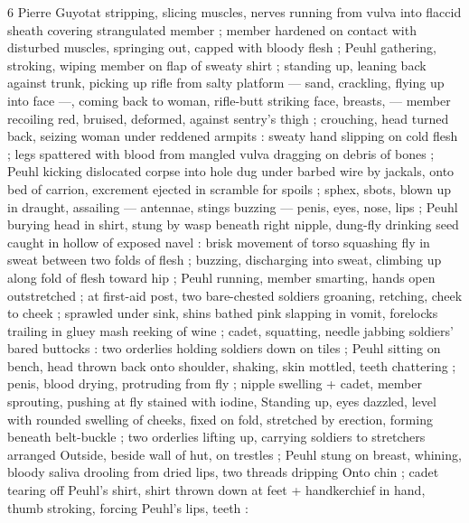 6 Pierre Guyotat
stripping, slicing muscles, nerves running from vulva into flaccid
sheath covering strangulated member ; member hardened on contact
with disturbed muscles, springing out, capped with bloody flesh ;
Peuhl gathering, stroking, wiping member on flap of sweaty shirt ;
standing up, leaning back against trunk, picking up rifle from salty
platform — sand, crackling, flying up into face —, coming back to
woman, rifle-butt striking face, breasts, — member recoiling red,
bruised, deformed, against sentry’s thigh ; crouching, head turned
back, seizing woman under reddened armpits : sweaty hand slipping
on cold flesh ; legs spattered with blood from mangled vulva
dragging on debris of bones ; Peuhl kicking dislocated corpse into
hole dug under barbed wire by jackals, onto bed of carrion,
excrement ejected in scramble for spoils ; sphex, sbots, blown up in
draught, assailing — antennae, stings buzzing — penis, eyes, nose,
lips ; Peuhl burying head in shirt, stung by wasp beneath right
nipple, dung-fly drinking seed caught in hollow of exposed navel :
brisk movement of torso squashing fly in sweat between two folds of
flesh ; buzzing, discharging into sweat, climbing up along fold of
flesh toward hip ; Peuhl running, member smarting, hands open
outstretched ; at first-aid post, two bare-chested soldiers groaning,
retching, cheek to cheek ; sprawled under sink, shins bathed pink
slapping in vomit, forelocks trailing in gluey mash reeking of wine ;
cadet, squatting, needle jabbing soldiers’ bared buttocks : two
orderlies holding soldiers down on tiles ; Peuhl sitting on bench,
head thrown back onto shoulder, shaking, skin mottled, teeth
chattering ; penis, blood drying, protruding from fly ; nipple swelling
+ cadet, member sprouting, pushing at fly stained with iodine,
Standing up, eyes dazzled, level with rounded swelling of cheeks,
fixed on fold, stretched by erection, forming beneath belt-buckle ;
two orderlies lifting up, carrying soldiers to stretchers arranged
Outside, beside wall of hut, on trestles ; Peuhl stung on breast,
whining, bloody saliva drooling from dried lips, two threads dripping
Onto chin ; cadet tearing off Peuhl's shirt, shirt thrown down at feet
+ handkerchief in hand, thumb stroking, forcing Peuhl’s lips, teeth :

